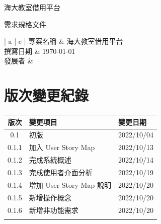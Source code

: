 \documentclass{article}
\begin{document}
\begin{titlepage}
	\centering

	{\huge 海大教室借用平台}

	\vfill

	{\huge 需求規格文件}

	\vfill

	\begin{Large}
		\begin{center}
			\begin{tabular}{| a | c |}
				\hline
				專案名稱 & 海大教室借用平台               \\ \hline
				撰寫日期 & \today                 \\ \hline
				發展者  &  \\ \hline
			\end{tabular}
		\end{center}
	\end{Large}
\end{titlepage}


\section*{版次變更紀錄}

\begin{tabularx}{\textwidth}{| c | X | X |}
	\rowcolor{LightGray}
	\hline
	版次    & 變更項目                 & 變更日期       \\ \hline
	0.1   & 初版                   & 2022/10/04 \\ \hline
	0.1.1 & 加入 User Story Map    & 2022/10/13 \\ \hline
	0.1.2 & 完成系統概述               & 2022/10/14 \\ \hline
	0.1.3 & 完成使用者介面分析            & 2022/10/19 \\ \hline
	0.1.4 & 增加 User Story Map 說明 & 2022/10/20 \\ \hline
	0.1.5 & 新增操作概念               & 2022/10/20 \\ \hline
	0.1.6 & 新增非功能需求              & 2022/10/20 \\ \hline
	      &                      &            \\ \hline
\end{tabularx}

\newpage

\begin{center}
	\tableofcontents
\end{center}
\end{document}
